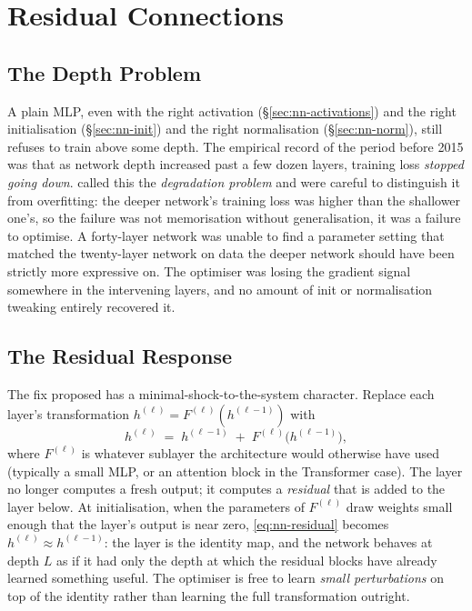 
\section{Residual Connections}
\label{sec:nn-residual}

\subsection{The Depth Problem}

A plain MLP, even with the right activation
(\S\ref{sec:nn-activations}) and the right initialisation
(\S\ref{sec:nn-init}) and the right normalisation
(\S\ref{sec:nn-norm}), still refuses to train above some depth.
The empirical record of the period before 2015 was that as
network depth increased past a few dozen layers, training loss
\emph{stopped going down}. \citet{he2016resnet} called this the
\emph{degradation problem} and were careful to distinguish it
from overfitting: the deeper network's training loss was higher
than the shallower one's, so the failure was not memorisation
without generalisation, it was a failure to optimise. A
forty-layer network was unable to find a parameter setting that
matched the twenty-layer network on data the deeper network
should have been strictly more expressive on. The optimiser was
losing the gradient signal somewhere in the intervening layers,
and no amount of init or normalisation tweaking entirely
recovered it.

\subsection{The Residual Response}

The fix \citet{he2016resnet} proposed has a minimal-shock-to-the-system
character. Replace each layer's transformation
$h^{(\ell)} = F^{(\ell)}(h^{(\ell-1)})$ with
\begin{equation}
  h^{(\ell)} \;=\; h^{(\ell-1)} \;+\; F^{(\ell)}\!\bigl(h^{(\ell-1)}\bigr),
  \label{eq:nn-residual}
\end{equation}
where $F^{(\ell)}$ is whatever sublayer the architecture would
otherwise have used (typically a small MLP, or an attention block
in the Transformer case). The layer no longer computes a fresh
output; it computes a \emph{residual} that is added to the layer
below. At initialisation, when the parameters of $F^{(\ell)}$
draw weights small enough that the layer's output is near zero,
\eqref{eq:nn-residual} becomes $h^{(\ell)} \approx h^{(\ell-1)}$:
the layer is the identity map, and the network behaves at depth
$L$ as if it had only the depth at which the residual blocks
have already learned something useful. The optimiser is free to
learn \emph{small perturbations} on top of the identity rather
than learning the full transformation outright.

